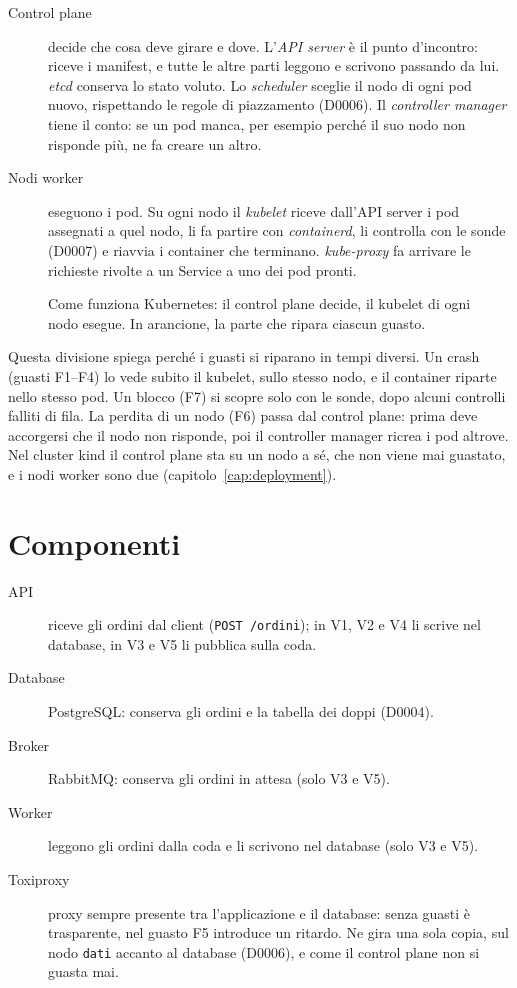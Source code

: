 \begin{description}
  \item[Control plane] decide che cosa deve girare e dove. L'\emph{API server} è il punto d'incontro: riceve i manifest, e tutte le altre parti leggono e scrivono passando da lui. \emph{etcd} conserva lo stato voluto. Lo \emph{scheduler} sceglie il nodo di ogni pod nuovo, rispettando le regole di piazzamento (D0006). Il \emph{controller manager} tiene il conto: se un pod manca, per esempio perché il suo nodo non risponde più, ne fa creare un altro.
  \item[Nodi worker] eseguono i pod. Su ogni nodo il \emph{kubelet} riceve dall'API server i pod assegnati a quel nodo, li fa partire con \emph{containerd}, li controlla con le sonde (D0007) e riavvia i container che terminano. \emph{kube-proxy} fa arrivare le richieste rivolte a un Service a uno dei pod pronti.
\end{description}

\begin{figure}[htbp]
\centering
\resizebox{\linewidth}{!}{}
\caption{Come funziona Kubernetes: il control plane decide, il kubelet di ogni nodo esegue. In arancione, la parte che ripara ciascun guasto.}
\label{fig:kubernetes}
\end{figure}

Questa divisione spiega perché i guasti si riparano in tempi diversi. Un crash (guasti F1--F4) lo vede subito il kubelet, sullo stesso nodo, e il container riparte nello stesso pod. Un blocco (F7) si scopre solo con le sonde, dopo alcuni controlli falliti di fila. La perdita di un nodo (F6) passa dal control plane: prima deve accorgersi che il nodo non risponde, poi il controller manager ricrea i pod altrove. Nel cluster kind il control plane sta su un nodo a sé, che non viene mai guastato, e i nodi worker sono due (capitolo~\ref{cap:deployment}).

\section{Componenti}

\begin{description}
  \item[API] riceve gli ordini dal client (\texttt{POST /ordini}); in V1, V2 e V4 li scrive nel database, in V3 e V5 li pubblica sulla coda.
  \item[Database] PostgreSQL: conserva gli ordini e la tabella dei doppi (D0004).
  \item[Broker] RabbitMQ: conserva gli ordini in attesa (solo V3 e V5).
  \item[Worker] leggono gli ordini dalla coda e li scrivono nel database (solo V3 e V5).
  \item[Toxiproxy] proxy sempre presente tra l'applicazione e il database: senza guasti è trasparente, nel guasto F5 introduce un ritardo. Ne gira una sola copia, sul nodo \texttt{dati} accanto al database (D0006), e come il control plane non si guasta mai.
\end{description}


